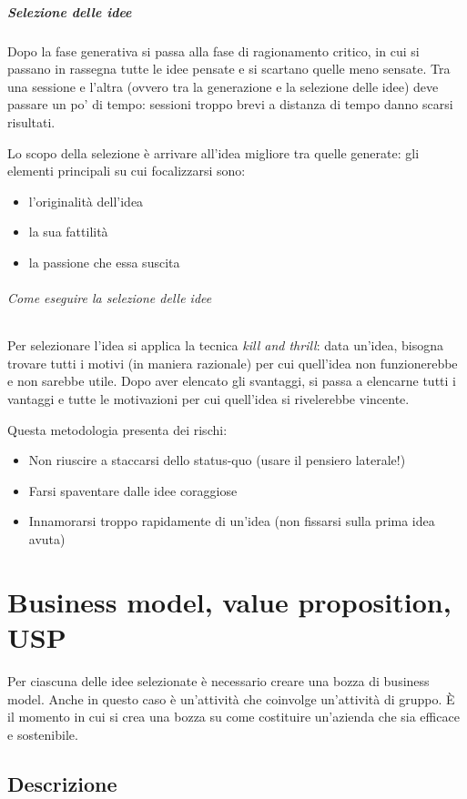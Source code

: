 \paragraph*{Selezione delle idee} Dopo la fase generativa si passa alla fase di
ragionamento critico, in cui si passano in rassegna tutte le idee pensate e si
scartano quelle meno sensate. Tra una sessione e l'altra (ovvero tra la
generazione e la selezione delle idee) deve passare un po' di tempo: sessioni
troppo brevi a distanza di tempo danno scarsi risultati.

Lo scopo della selezione è arrivare all'idea migliore tra quelle generate: gli
elementi principali su cui focalizzarsi sono:
\begin{itemize}
 \item l'originalità dell'idea
 \item la sua fattilità
 \item la passione che essa suscita
\end{itemize}

\subparagraph*{Come eseguire la selezione delle idee} Per selezionare l'idea si
applica la tecnica \textit{kill and thrill}: data un'idea, bisogna trovare
tutti i motivi (in maniera razionale) per cui quell'idea non funzionerebbe e
non sarebbe utile. Dopo aver elencato gli svantaggi, si passa a elencarne tutti
i vantaggi e tutte le motivazioni per cui quell'idea si rivelerebbe vincente.

Questa metodologia presenta dei rischi:
\begin{itemize}
 \item Non riuscire a staccarsi dello status-quo (usare il pensiero laterale!)
 \item Farsi spaventare dalle idee coraggiose
 \item Innamorarsi troppo rapidamente di un'idea (non fissarsi sulla prima idea
avuta)
\end{itemize}

\chapter{Business model, value proposition, USP}

Per ciascuna delle idee selezionate è necessario creare una bozza di business
model. Anche in questo caso è un'attività che coinvolge un'attività di gruppo. È
il momento in cui si crea una bozza su come costituire un'azienda che sia
efficace e sostenibile.

\section{Descrizione}

